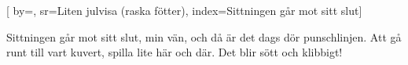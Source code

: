 
[ 		%
	by={},					%
	sr={Liten julvisa (raska fötter)},					%
	index={Sittningen går mot sitt slut}]						%
	
\beginverse*						%
Sittningen går mot sitt slut, min vän, 
och då är det dags dör punschlinjen. 
Att gå runt till vart kuvert, 
spilla lite här och där. 
Det blir sött och klibbigt!
\endverse							%

\endsong							%